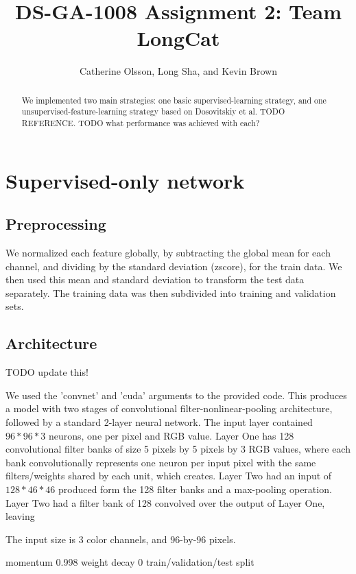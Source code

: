 \documentclass{article} %
\title{DS-GA-1008 Assignment 2: Team LongCat}
\author{
Catherine Olsson, Long Sha, and Kevin Brown \\
}
\begin{document}
\maketitle

\begin{abstract}
We implemented two main strategies: one basic supervised-learning
strategy, and one unsupervised-feature-learning strategy based on Dosovitskiy
et al. TODO REFERENCE. TODO what performance was achieved with each?
\end{abstract}


\section{Supervised-only network}

\subsection{Preprocessing}

We normalized each feature globally, by subtracting the global mean for
each channel, and dividing by the standard deviation (zscore), for the train
data. We then used this mean and standard deviation to transform the test data separately. The training data was then subdivided into training and validation sets. 

\subsection{Architecture}
TODO update this!

We used the 'convnet' and 'cuda' arguments to the provided code. This produces
a model with two stages of convolutional filter-nonlinear-pooling architecture,
followed by a standard 2-layer neural network. The input layer contained
$96*96*3$ neurons, one per pixel and RGB value. Layer One has 128 convolutional
filter banks of size 5 pixels by 5 pixels by 3 RGB values, where each bank
convolutionally represents one neuron per input pixel with the same
filters/weights shared by each unit, which creates. Layer Two had an input of
$128*46*46$ produced form the 128 filter banks and a max-pooling operation.
Layer Two had a filter bank of 128 convolved over the output of Layer One,
leaving 



The input size is 3 color channels, and 96-by-96 pixels. 

momentum 0.998
weight decay 0
train/validation/test split
\end{document}
